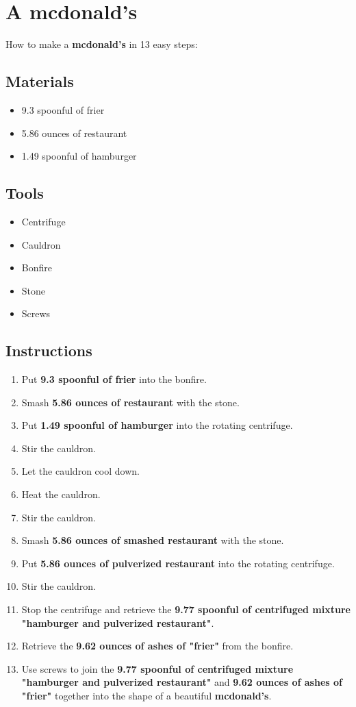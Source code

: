 \documentclass{article}
\begin{document}
\section{A mcdonald's}How to make a \textbf{mcdonald's} in 13 easy steps:

\subsection{Materials}\begin{itemize}
\item 
9.3 spoonful of frier
\item 
5.86 ounces of restaurant
\item 
1.49 spoonful of hamburger
\end{itemize}
\subsection{Tools}\begin{itemize}
\item 
Centrifuge
\item 
Cauldron
\item 
Bonfire
\item 
Stone
\item 
Screws
\end{itemize}
\subsection{Instructions}\begin{enumerate}
\item 
Put \textbf{9.3 spoonful of frier} into the bonfire.
\item 
Smash \textbf{5.86 ounces of restaurant} with the stone.
\item 
Put \textbf{1.49 spoonful of hamburger} into the rotating centrifuge.
\item 
Stir the cauldron.
\item 
Let the cauldron cool down.
\item 
Heat the cauldron.
\item 
Stir the cauldron.
\item 
Smash \textbf{5.86 ounces of smashed restaurant} with the stone.
\item 
Put \textbf{5.86 ounces of pulverized restaurant} into the rotating centrifuge.
\item 
Stir the cauldron.
\item 
Stop the centrifuge and retrieve the \textbf{9.77 spoonful of centrifuged mixture "hamburger and pulverized restaurant"}.
\item 
Retrieve the \textbf{9.62 ounces of ashes of "frier"} from the bonfire.
\item 
Use screws to join the \textbf{9.77 spoonful of centrifuged mixture "hamburger and pulverized restaurant"} and \textbf{9.62 ounces of ashes of "frier"} together into the shape of a beautiful \textbf{mcdonald's}.
\end{enumerate}
\newpage
\end{document}
